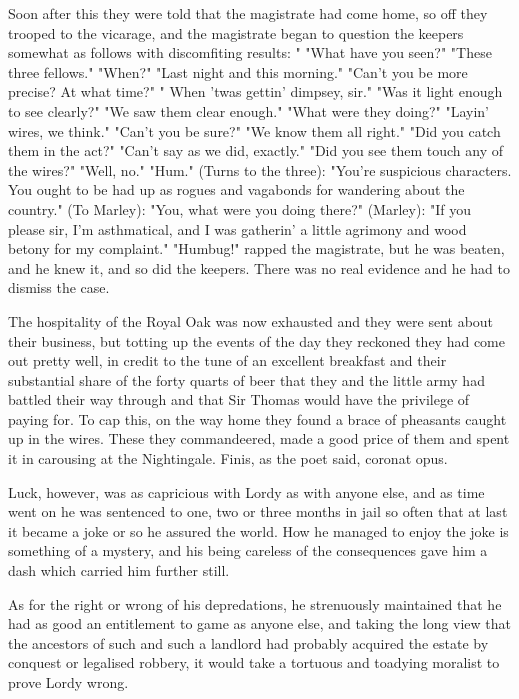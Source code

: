 Soon after this they were told that the magistrate had come home, so off they trooped to the vicarage, and the magistrate began to question the keepers somewhat as follows   with discomfiting results: "
 "What have you seen?" 
   "These three fellows."
 "When?" 
   "Last night and this morning."
 "Can't you be more precise? At what time?"   
   " When 'twas gettin' dimpsey, sir."
 "Was it light enough to see clearly?"
   "We saw them clear enough."
 "What were they doing?"
   "Layin' wires, we think."
 "Can't you be sure?"
   "We know them all right."
 "Did you catch them in the act?"
   "Can't say as we did, exactly."
 "Did you see them touch any of the wires?"
   "Well, no."
 "Hum." (Turns to the three): "You're suspicious characters. You ought to be had up as rogues and vagabonds for wandering about the country." (To Marley): "You, what were you doing there?"
 (Marley): "If you please sir, I'm asthmatical, and I was gatherin' a little agrimony and wood betony for my complaint."
 "Humbug!" rapped the magistrate, but he was beaten, and he knew it, and so did the keepers. There was no real evidence and he had to dismiss the case.

The hospitality of the Royal Oak was now exhausted and they were sent about their business, but totting up the events of the day they reckoned they had come out pretty well, in credit to the tune of an excellent breakfast and their substantial share of the forty quarts of beer that they and the little army had battled their way through and that Sir Thomas would have the privilege of paying for.
 To cap this, on the way home they found a brace of pheasants caught up in the wires. These they commandeered, made a good price of them and spent it in carousing at the Nightingale.
 Finis, as the poet said, coronat opus.
 
\Flourish

Luck, however, was as capricious with Lordy as with anyone else, and as time went on he was sentenced to one, two or three months in jail so often that at last it became a joke   or so he assured the world. How he managed to enjoy the joke is something of a mystery, and his being careless of the consequences gave him a dash which carried him further still.

As for the right or wrong of his depredations, he strenuously maintained that he had as good an entitlement to game as anyone else, and taking the long view that the ancestors of such and such a landlord had probably acquired the estate by conquest or legalised robbery, it would take a tortuous and toadying moralist to prove Lordy wrong.

